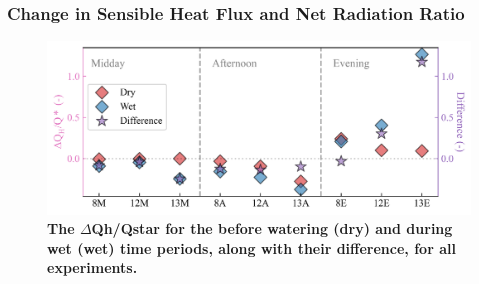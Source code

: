 \documentclass[final,3p,times,authoryear]{elsarticle}
\newcommand{\beginsupplement}{%
        \setcounter{table}{0}
        \renewcommand{\thetable}{S\arabic{table}}%
        \setcounter{figure}{0}
        \renewcommand{\thefigure}{S\arabic{figure}}%
     }
\begin{document}
\subsubsection{Change in Sensible Heat Flux and Net Radiation Ratio}\label{sec:appendix7.5.12}

\begin{figure}
\centering
\includegraphics[trim={0 0 0 0},clip,scale=1.0]{pict047.png}
\caption{\bf The $\Delta$\gls{Qh}/\gls{Qstar} for the before watering (dry) and during wet (wet) time periods, along with their difference, for all experiments.}
 \label{fig:7.19}
\end{figure}


\end{document}
